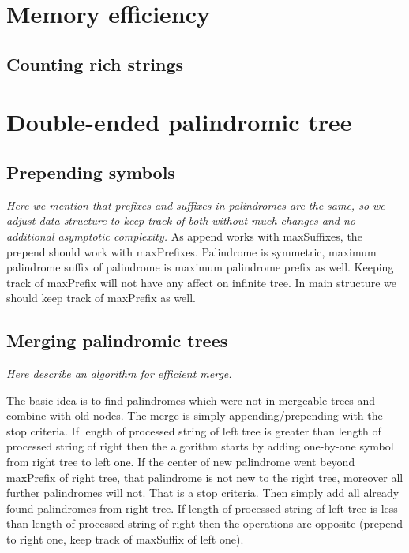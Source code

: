 \section{Memory efficiency}

\subsection{Counting rich strings}

\section{Double-ended palindromic tree}

\subsection{Prepending symbols}

\emph{Here we mention that prefixes and suffixes
in palindromes are the same, so we adjust data structure
to keep track of both without much changes and no
additional asymptotic complexity.}
As append works with maxSuffixes, the prepend should work with maxPrefixes.
Palindrome is symmetric, maximum palindrome suffix of palindrome is maximum palindrome prefix as well. Keeping track of maxPrefix will not have any affect on infinite tree. In main structure we should keep track of maxPrefix as well.

\subsection{Merging palindromic trees}

\emph{Here describe an algorithm for efficient merge.}

The basic idea is to find palindromes which were not in mergeable trees and combine with old nodes. The merge is simply appending/prepending with the stop criteria. If length of processed string of left tree is greater than length of processed string of right then the algorithm starts by adding one-by-one symbol from right tree to left one. If the center of new palindrome went beyond maxPrefix of right tree, that palindrome is not new to the right tree, moreover all further palindromes will not. That is a stop criteria. Then simply add all already found palindromes from right tree. If length of processed string of left tree is less than length of processed string of right then the operations are opposite (prepend to right one, keep track of maxSuffix of left one).

